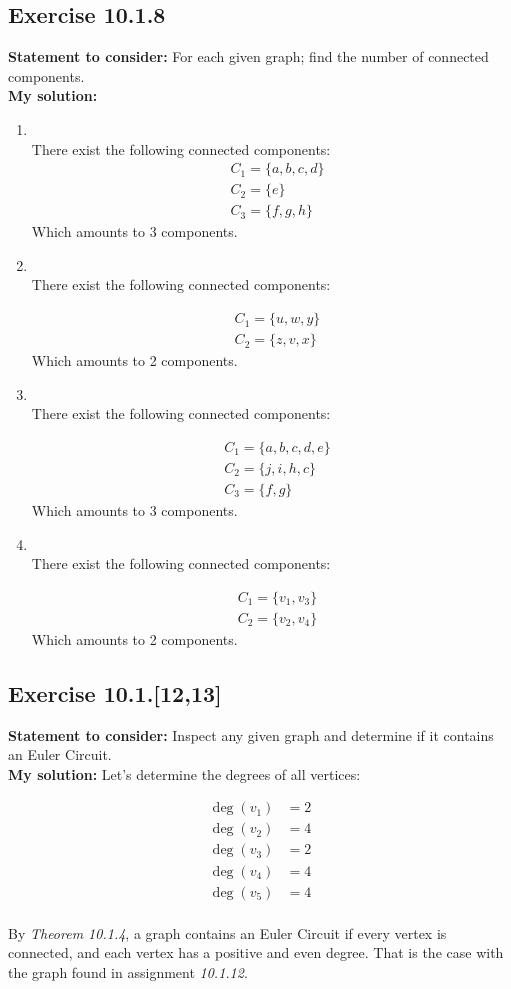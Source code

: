 \documentclass{report}
\newcommand{\mAlign}[1]{\begin{align*}#1\end{align*}}
\newcommand{\assignmentDescription}{\textbf{Statement to consider: }}
\newcommand{\solution}{\textbf{My solution: }}
\newcommand{\Exercise}[1]{\subsection{Exercise #1}}
\newcommand{\defaultEnumerateLabel}{\textbf{\alph*.}}
\newcommand{\emptyItem}{\item \,\\}
\begin{document}
	\Exercise{10.1.8}
	
	\assignmentDescription
	For each given graph; find the number of connected components.\\
	
	\solution
	\begin{enumerate}[label=\defaultEnumerateLabel]
		\emptyItem
		There exist the following connected components:
		\mAlign{&C_1 = \{a,b,c,d\}\\
					   &C_2 = \{e\} \\
				   	   &C_3=\{f,g,h\}}
  	   Which amounts to 3 components.
  	   
  	   \emptyItem
  	   There exist the following connected components:
  	   
  	   \mAlign{&C_1 = \{u,w,y\}\\
  	   	  			 &C_2 = \{z,v,x\}}
  	   Which amounts to 2 components.
		
		\emptyItem
		There exist the following connected components:
		
		\mAlign{&C_1 = \{a,b,c,d,e\}\\
			&C_2 = \{j,i,h,c\}\\
			&C_3 = \{f,g\}}
		Which amounts to 3 components.
		
		\emptyItem
		There exist the following connected components:
		
		\mAlign{&C_1 = \{v_1,v_3\}\\
			&C_2 = \{v_2,v_4\}}
		Which amounts to 2 components.
	\end{enumerate}
	
	\Exercise{10.1.[12,13]}
	
	\assignmentDescription
	Inspect any given graph and determine if it contains an Euler Circuit.\\
	
	\solution
	Let's determine the degrees of all vertices:
	
	\mAlign{\deg(v_1) &= 2 \\
				 \deg(v_2) &= 4 \\
		 		 \deg(v_3) &= 2 \\
		 		 \deg(v_4) &= 4 \\
		 		 \deg(v_5) &= 4 \\}
	 
	By \textit{Theorem 10.1.4}, a graph contains an Euler Circuit if every vertex is connected, and each vertex has a positive and even degree. That is the case with the graph found in assignment \textit{10.1.12}.\\
	
\end{document}

